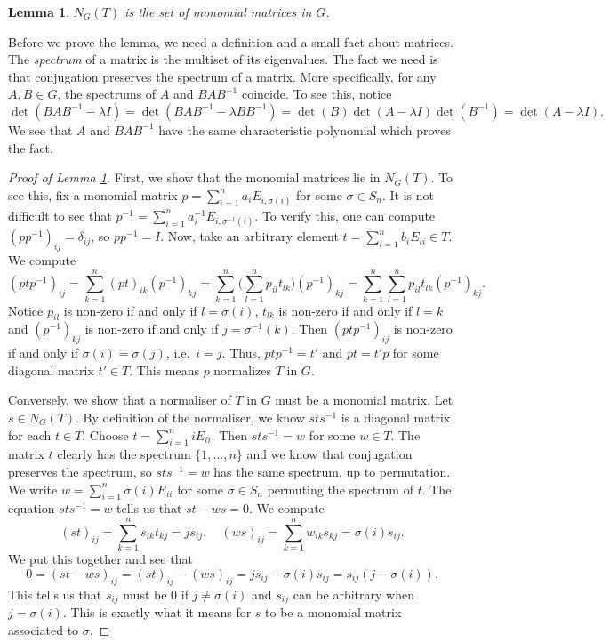 \documentclass[11pt]{amsart}
\newtheorem{lem}[thm]{Lemma}
\theoremstyle{remark}
\begin{document}
\begin{lem}\label{lemma: normaliser_is_generalised_permutation_matrices}
	$N_G(T)$ is the set of monomial matrices in $G$.
\end{lem}

Before we prove the lemma, we need a definition and a small fact about matrices.
The \emph{spectrum} of a matrix is the multiset of its eigenvalues.
The fact we need is that conjugation preserves the spectrum of a matrix.
More specifically, for any $A,B\in G$, the spectrums of $A$ and $BAB^{-1}$ coincide.
To see this, notice
\[
	\det(BAB^{-1}-\lambda I) = \det(BAB^{-1}-\lambda BB^{-1}) = \det(B)\det(A-\lambda I)\det(B^{-1}) = \det(A-\lambda I).
\]
We see that $A$ and $BAB^{-1}$ have the same characteristic polynomial which proves the fact.

\begin{proof}[Proof of Lemma \ref{lemma: normaliser_is_generalised_permutation_matrices}]
	First, we show that the monomial matrices lie in $N_G(T)$.
	To see this, fix a monomial matrix $p = \sum_{i=1}^n a_i E_{i,\sigma(i)}$ for some $\sigma\in S_n$.
	It is not difficult to see that $p^{-1} = \sum_{i=1}^n a_i^{-1} E_{i,\sigma^{-1}(i)}$.
	To verify this, one can compute $(pp^{-1})_{ij} = \delta_{ij}$, so $pp^{-1}=I$.
	Now, take an arbitrary element $t=\sum_{i=1}^n b_i E_{ii}\in T$.
	We compute
	\[
		(ptp^{-1})_{ij} = \sum_{k=1}^n (pt)_{ik}(p^{-1})_{kj} = \sum_{k=1}^n \bigg(\sum_{l=1}^n p_{il}t_{lk}\bigg)(p^{-1})_{kj} = \sum_{k=1}^n \sum_{l=1}^n p_{il}t_{lk}(p^{-1})_{kj}.
	\]
	Notice $p_{il}$ is non-zero if and only if $l=\sigma(i)$, $t_{lk}$ is non-zero if and only if $l=k$ and $(p^{-1})_{kj}$ is non-zero if and only if $j=\sigma^{-1}(k)$.
	Then $(ptp^{-1})_{ij}$ is non-zero if and only if $\sigma(i)=\sigma(j)$, i.e.\ $i=j$.
	Thus, $ptp^{-1}=t'$ and $pt=t'p$ for some diagonal matrix $t'\in T$.
	This means $p$ normalizes $T$ in $G$.

	Conversely, we show that a normaliser of $T$ in $G$ must be a monomial matrix.
	Let $s\in N_G(T)$.
	By definition of the normaliser, we know $sts^{-1}$ is a diagonal matrix for each $t\in T$.
	Choose $t=\sum_{i=1}^n iE_{ii}$.
	Then $sts^{-1} = w$ for some $w\in T$.
	The matrix $t$ clearly has the spectrum $\{1,\ldots,n\}$ and we know that conjugation preserves the spectrum, so $sts^{-1}=w$ has the same spectrum, up to permutation.
	We write $w = \sum_{i=1}^n \sigma(i) E_{ii}$ for some $\sigma\in S_n$ permuting the spectrum of $t$.
	The equation $sts^{-1}=w$ tells us that $st-ws=0$.
	We compute
	\[
		(st)_{ij} = \sum_{k=1}^n s_{ik}t_{kj} = js_{ij},\quad (ws)_{ij} = \sum_{k=1}^n w_{ik}s_{kj} = \sigma(i)s_{ij}.
	\]
	We put this together and see that
	\[
		0 = (st-ws)_{ij} = (st)_{ij} - (ws)_{ij} = js_{ij}-\sigma(i)s_{ij} = s_{ij}(j-\sigma(i)).
	\]
	This tells us that $s_{ij}$ must be $0$ if $j\neq \sigma(i)$ and $s_{ij}$ can be arbitrary when $j=\sigma(i)$.
	This is exactly what it means for $s$ to be a monomial matrix associated to $\sigma$.
\end{proof}
\end{document}
